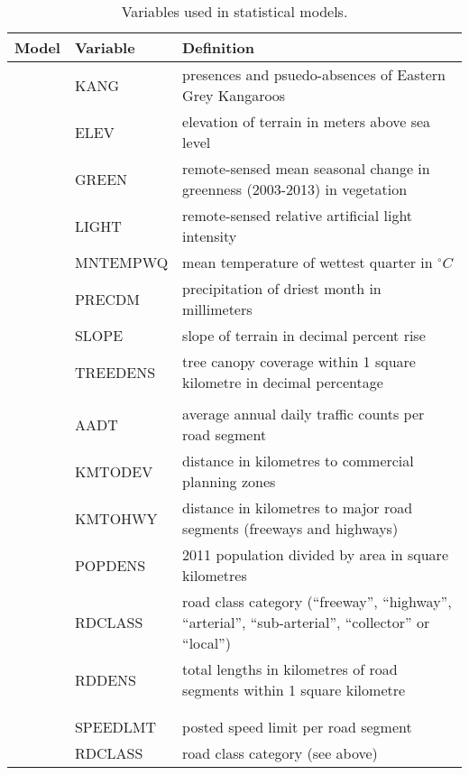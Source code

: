 \begin{table}[htp]
\caption[Variables used in statistical models]{Variables used in statistical models.}
\begin{tabularx}{0.9\textwidth}{llY} \toprule
Model &Variable    &Definition\\ \midrule 
{}   &KANG        &presences and psuedo-absences of Eastern Grey Kangaroos\\
           		 &ELEV        &elevation of terrain in meters above sea level\\
           		 &GREEN       &remote-sensed mean seasonal change in greenness (2003-2013) in vegetation\\
           		 &LIGHT       &remote-sensed relative artificial light intensity\\
           		 &MNTEMPWQ    &mean temperature of wettest quarter in $^{\circ}C$\\
           		 &PRECDM      &precipitation of driest month in millimeters\\
           		 &SLOPE       &slope of terrain in decimal percent rise\\
           		 &TREEDENS    &tree canopy coverage within 1 square kilometre in decimal percentage\\
&&\\
   &AADT        &average annual daily traffic counts per road segment\\
           		 &KMTODEV     &distance in kilometres to commercial planning zones\\
           		 &KMTOHWY     &distance in kilometres to major road segments (freeways and highways)\\
           		 &POPDENS     &2011 population divided by area in square kilometres\\
           		 &RDCLASS     &road class category (``freeway'', ``highway'', ``arterial'', ``sub-arterial'', ``collector'' or ``local'')\\
           		 &RDDENS      &total lengths in kilometres of road segments within 1 square kilometre\\
&&\\
 &&\\
    			 &SPEEDLMT    &posted speed limit per road segment	\\
           		 &RDCLASS     &road class category (see above)\\

\end{tabularx}
\end{table}
